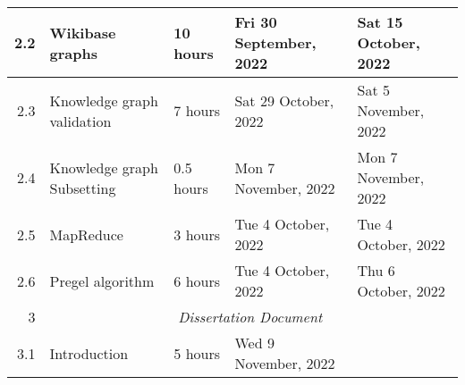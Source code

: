 \documentclass{standalone}
\begin{document}
\begin{tabular}{|r|llll|}
    2.2                                                           & \multicolumn{1}{l|}{Wikibase graphs}                            & \multicolumn{1}{l|}{10 hours}                                  & \multicolumn{1}{l|}{Fri 30 September, 2022}                 & Sat 15 October, 2022                                         \\ \hline
    2.3                                                           & \multicolumn{1}{l|}{Knowledge graph validation}                 & \multicolumn{1}{l|}{7 hours}                                   & \multicolumn{1}{l|}{Sat 29 October, 2022}                   & Sat 5 November, 2022                                         \\ \hline
    2.4                                                           & \multicolumn{1}{l|}{Knowledge graph Subsetting}                 & \multicolumn{1}{l|}{0.5 hours}                                 & \multicolumn{1}{l|}{Mon 7 November, 2022}                   & Mon 7 November, 2022                                         \\ \hline
    2.5                                                           & \multicolumn{1}{l|}{MapReduce}                                  & \multicolumn{1}{l|}{3 hours}                                   & \multicolumn{1}{l|}{Tue 4 October, 2022}                    & Tue 4 October, 2022                                          \\ \hline
    2.6                                                           & \multicolumn{1}{l|}{Pregel algorithm}                           & \multicolumn{1}{l|}{6 hours}                                   & \multicolumn{1}{l|}{Tue 4 October, 2022}                    & Thu 6 October, 2022                                          \\ \hline
    3                                                             & \multicolumn{4}{c|}{\textit{Dissertation Document}}                                                                                                                                                                                                           \\ \hline
    3.1                                                           & \multicolumn{1}{l|}{Introduction}                               & \multicolumn{1}{l|}{5 hours}                                   & \multicolumn{1}{l|}{Wed 9 November, 2022}                   &                                                              \\ \hline

\end{tabular}
\end{document}
